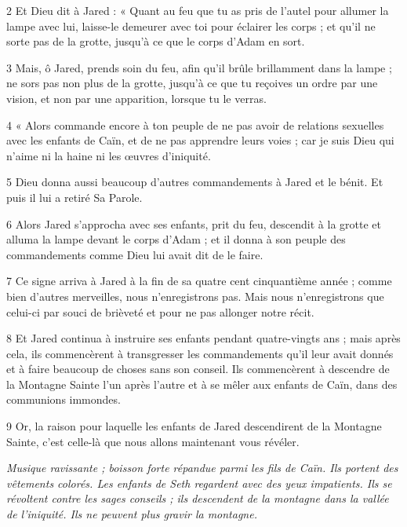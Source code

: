 \par 2 Et Dieu dit à Jared : « Quant au feu que tu as pris de l'autel pour allumer la lampe avec lui, laisse-le demeurer avec toi pour éclairer les corps ; et qu'il ne sorte pas de la grotte, jusqu'à ce que le corps d'Adam en sort.

\par 3 Mais, ô Jared, prends soin du feu, afin qu'il brûle brillamment dans la lampe ; ne sors pas non plus de la grotte, jusqu'à ce que tu reçoives un ordre par une vision, et non par une apparition, lorsque tu le verras.

\par 4 « Alors commande encore à ton peuple de ne pas avoir de relations sexuelles avec les enfants de Caïn, et de ne pas apprendre leurs voies ; car je suis Dieu qui n’aime ni la haine ni les œuvres d’iniquité.

\par 5 Dieu donna aussi beaucoup d'autres commandements à Jared et le bénit. Et puis il lui a retiré Sa Parole.

\par 6 Alors Jared s'approcha avec ses enfants, prit du feu, descendit à la grotte et alluma la lampe devant le corps d'Adam ; et il donna à son peuple des commandements comme Dieu lui avait dit de le faire.

\par 7 Ce signe arriva à Jared à la fin de sa quatre cent cinquantième année ; comme bien d’autres merveilles, nous n’enregistrons pas. Mais nous n’enregistrons que celui-ci par souci de brièveté et pour ne pas allonger notre récit.

\par 8 Et Jared continua à instruire ses enfants pendant quatre-vingts ans ; mais après cela, ils commencèrent à transgresser les commandements qu'il leur avait donnés et à faire beaucoup de choses sans son conseil. Ils commencèrent à descendre de la Montagne Sainte l'un après l'autre et à se mêler aux enfants de Caïn, dans des communions immondes.

\par 9 Or, la raison pour laquelle les enfants de Jared descendirent de la Montagne Sainte, c'est celle-là que nous allons maintenant vous révéler.




\par \textit{Musique ravissante ; boisson forte répandue parmi les fils de Caïn. Ils portent des vêtements colorés. Les enfants de Seth regardent avec des yeux impatients. Ils se révoltent contre les sages conseils ; ils descendent de la montagne dans la vallée de l'iniquité. Ils ne peuvent plus gravir la montagne.}

